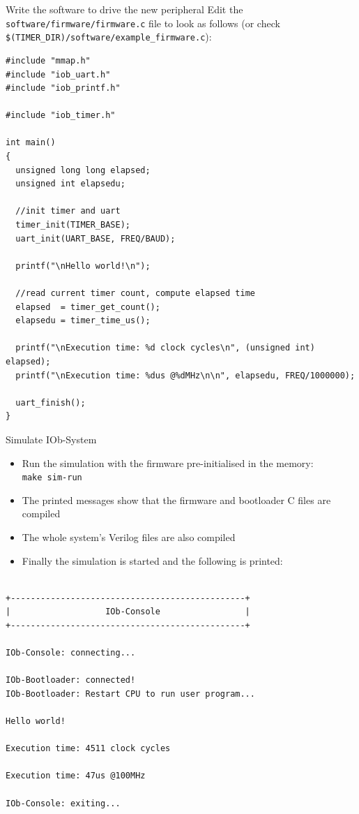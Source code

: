 \documentclass [xcolor=svgnames, t] {beamer}
\begin{document}
\begin{frame}[fragile]{Write the software to drive the new peripheral}
    Edit the {\tt software/firmware/firmware.c} file to look as follows (or check
    {\tt \$(TIMER\_DIR)/software/example\_firmware.c}):
  \begin{tiny}
    \begin{lstlisting}
#include "mmap.h"
#include "iob_uart.h"
#include "iob_printf.h"

#include "iob_timer.h"

int main()
{
  unsigned long long elapsed;
  unsigned int elapsedu;

  //init timer and uart
  timer_init(TIMER_BASE);
  uart_init(UART_BASE, FREQ/BAUD);

  printf("\nHello world!\n");

  //read current timer count, compute elapsed time
  elapsed  = timer_get_count();
  elapsedu = timer_time_us();

  printf("\nExecution time: %d clock cycles\n", (unsigned int) elapsed);
  printf("\nExecution time: %dus @%dMHz\n\n", elapsedu, FREQ/1000000);

  uart_finish();
}
    \end{lstlisting}
  \end{tiny}
\end{frame}


\begin{frame}[fragile]{Simulate IOb-System}
\begin{itemize}
\item Run the simulation with the firmware pre-initialised in the memory:\\
  {\tt make sim-run}
\item The printed messages show that the firmware and bootloader C files are compiled
\item The whole system's Verilog files are also compiled
\item Finally the simulation is started and the following is printed:
\end{itemize}

\begin{tiny}
  \begin{lstlisting}

+-----------------------------------------------+
|                   IOb-Console                 |
+-----------------------------------------------+

IOb-Console: connecting...

IOb-Bootloader: connected!
IOb-Bootloader: Restart CPU to run user program...

Hello world!

Execution time: 4511 clock cycles

Execution time: 47us @100MHz

IOb-Console: exiting...

  \end{lstlisting}
\end{tiny}
\end{frame}
\end{document}
